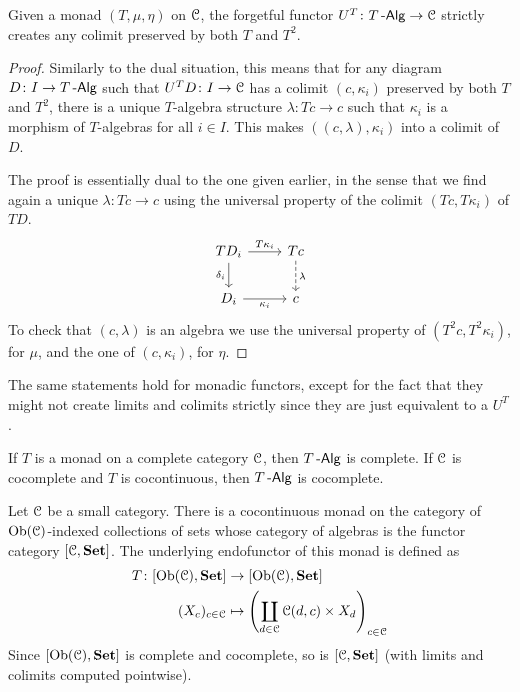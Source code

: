 \documentclass[a4paper,11pt,oneside,openany]{scrbook}
\begin{document}
\begin{prop}\label{create colims}
	Given a monad $(T,\mu,\eta)$ on $\operatorname{\mathcal{C}}$, the forgetful functor $U^T\colon T\operatorname{-\mathsf{Alg}}\rightarrow\operatorname{\mathcal{C}}$ strictly creates any colimit preserved by both $T$ and $T^2$.
\end{prop}

\begin{proof}
	Similarly to the dual situation, this means that for any diagram $D\colon I\rightarrow T\operatorname{-\mathsf{Alg}}$ such that $U^TD\colon I\rightarrow\operatorname{\mathcal{C}}$ has a colimit $(c,\kappa_i)$ preserved by both $T$ and $T^2$, there is a unique $T$-algebra structure $\lambda\colon Tc\rightarrow c$ such that $\kappa_i$ is a morphism of $T$-algebras for all $i\in I$. This makes $((c,\lambda),\kappa_i)$ into a colimit of $D$.

	The proof is essentially dual to the one given earlier, in the sense that we find again a unique $\lambda\colon Tc\rightarrow c$ using the universal property of the colimit $(Tc,T\kappa_i)$ of $TD$.
	\[
		\begin{tikzcd}
			TD_i\ar[r, "T\kappa_i"]\ar[d, "\delta_i"']
			& Tc\ar[d, dashed, "\lambda"] \\
			D_i\ar[r, "\kappa_i"']
			& c
		\end{tikzcd}
	\]
	To check that $(c,\lambda)$ is an algebra we use the universal property of $(T^2c,T^2\kappa_i)$, for $\mu$, and the one of $(c,\kappa_i)$, for $\eta$.
\end{proof}

\begin{rmk}
	The same statements hold for monadic functors, except for the fact that they might not create limits and colimits strictly since they are just equivalent to a $U^T$.
\end{rmk}

\begin{rmk}
	If $T$ is a monad on a complete category $\operatorname{\mathcal{C}}$, then $T\operatorname{-\mathsf{Alg}}$ is complete. If $\operatorname{\mathcal{C}}$ is cocomplete and $T$ is cocontinuous, then $T\operatorname{-\mathsf{Alg}}$ is cocomplete.
\end{rmk}

\begin{exmp}
	Let $\operatorname{\mathcal{C}}$ be a small category. There is a cocontinuous monad on the category of $\operatorname{Ob}(\operatorname{\mathcal{C}})$-indexed collections of sets whose category of algebras is the functor category $[\operatorname{\mathcal{C}},{\normalfont\textbf{Set}}]$. The underlying endofunctor of this monad is defined as
	\begin{align*}
		T\colon[\operatorname{Ob}(\operatorname{\mathcal{C}}),{\normalfont\textbf{Set}}] & \to[\operatorname{Ob}(\operatorname{\mathcal{C}}),{\normalfont\textbf{Set}}]                                               \\
		(X_c)_{c\in\operatorname{\mathcal{C}}}        & \mapsto \left(\coprod_{d\in\operatorname{\mathcal{C}}}\operatorname{\mathcal{C}}(d,c)\times X_d\right)_{c\in\operatorname{\mathcal{C}}}
	\end{align*}
	Since $[\operatorname{Ob}(\operatorname{\mathcal{C}}),{\normalfont\textbf{Set}}]$ is complete and cocomplete, so is $[\operatorname{\mathcal{C}},{\normalfont\textbf{Set}}]$ (with limits and colimits computed pointwise).
\end{exmp}
\end{document}
